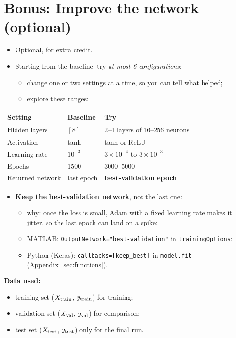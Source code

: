 \documentclass[11pt]{article}
\newcommand{\datause}[1]{\par\smallskip\needspace{4\baselineskip}\noindent\textbf{Data used:}\nopagebreak\begin{itemize}#1\end{itemize}}
\begin{document}
\section*{Bonus: Improve the network (optional)}
\begin{itemize}
  \item \aitrap Optional, for extra credit.
  \item Starting from the baseline, try \emph{at most 6 configurations}:
  \begin{itemize}
    \item change one or two settings at a time, so you can tell what helped;
    \item explore these ranges:
  \end{itemize}
\end{itemize}
\begin{center}
\small
\begin{tabular}{@{}lll@{}}
\toprule
Setting & Baseline & Try \\
\midrule
Hidden layers & $[8]$ & 2--4 layers of 16--256 neurons \\
Activation & tanh & tanh or ReLU \\
Learning rate & $10^{-3}$ & $3\times10^{-4}$ to $3\times10^{-3}$ \\
Epochs & 1500 & 3000--5000 \\
Returned network & last epoch & \textbf{best-validation epoch} \\
\bottomrule
\end{tabular}
\end{center}
\begin{itemize}
  \item \textbf{Keep the best-validation network}, not the last one:
  \begin{itemize}
    \item why: once the loss is small, Adam with a fixed learning rate makes it jitter, so the last epoch can land on a spike;
    \item MATLAB: \texttt{OutputNetwork="best-validation"} in \texttt{trainingOptions};
    \item Python (Keras): \texttt{callbacks=[keep\_best]} in \texttt{model.fit} (Appendix~\ref{sec:functions}).
  \end{itemize}
\end{itemize}
\datause{
  \item training set ($X_{\rm train}$, $y_{\rm train}$) for training;
  \item validation set ($X_{\rm val}$, $y_{\rm val}$) for comparison;
  \item test set ($X_{\rm test}$, $y_{\rm test}$) only for the final run.}
\end{document}
